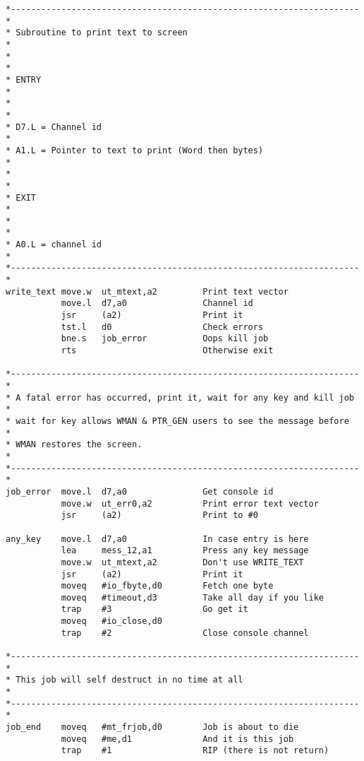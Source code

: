 \begin{lstlisting}[firstnumber=last,caption={Dataspace Program - Part 14 - Various Subroutines}]
*---------------------------------------------------------------------*
* Subroutine to print text to screen                                  *
*                                                                     *
* ENTRY                                                               *
*                                                                     *
* D7.L = Channel id                                                   *
* A1.L = Pointer to text to print (Word then bytes)                   *
*                                                                     *
* EXIT                                                                *
*                                                                     *
* A0.L = channel id                                                   *
*---------------------------------------------------------------------*
write_text move.w  ut_mtext,a2         Print text vector
           move.l  d7,a0               Channel id
           jsr     (a2)                Print it
           tst.l   d0                  Check errors
           bne.s   job_error           Oops kill job
           rts                         Otherwise exit

*---------------------------------------------------------------------*
* A fatal error has occurred, print it, wait for any key and kill job *
* wait for key allows WMAN & PTR_GEN users to see the message before  *
* WMAN restores the screen.                                           *
*---------------------------------------------------------------------*
job_error  move.l  d7,a0               Get console id
           move.w  ut_err0,a2          Print error text vector
           jsr     (a2)                Print to #0

any_key    move.l  d7,a0               In case entry is here
           lea     mess_12,a1          Press any key message
           move.w  ut_mtext,a2         Don't use WRITE_TEXT
           jsr     (a2)                Print it
           moveq   #io_fbyte,d0        Fetch one byte
           moveq   #timeout,d3         Take all day if you like
           trap    #3                  Go get it
           moveq   #io_close,d0
           trap    #2                  Close console channel

*---------------------------------------------------------------------*
* This job will self destruct in no time at all                       *
*---------------------------------------------------------------------*
job_end    moveq   #mt_frjob,d0        Job is about to die
           moveq   #me,d1              And it is this job
           trap    #1                  RIP (there is not return)


\end{lstlisting}
